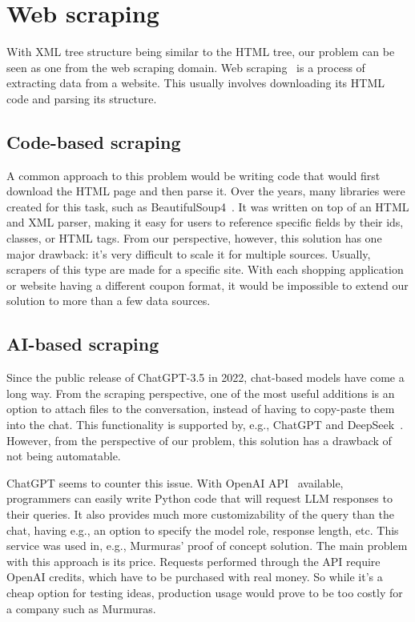 \documentclass[licencjacka,en]{pracamgr}
\begin{document}
\section{Web scraping}
With XML tree structure being similar to the HTML tree, our problem can be seen as one from the web scraping domain. Web scraping~\cite{WS} is a process of extracting data from a website. This usually involves downloading its HTML code and parsing its structure.

\subsection{Code-based scraping}
A common approach to this problem would be writing code that would first download the HTML page and then parse it. Over the years, many libraries were created for this task, such as BeautifulSoup4~\cite{zupa}. It was written on top of an HTML and XML parser, making it easy for users to reference specific fields by their ids, classes, or HTML tags. From our perspective, however, this solution has one major drawback: it's very difficult to scale it for multiple sources. Usually, scrapers of this type are made for a specific site. With each shopping application or website having a different coupon format, it would be impossible to extend our solution to more than a few data sources.

\subsection{AI-based scraping}
Since the public release of ChatGPT-3.5 in 2022, chat-based models have come a long way. From the scraping perspective, one of the most useful additions is an option to attach files to the conversation, instead of having to copy-paste them into the chat. This functionality is supported by, e.g., ChatGPT and DeepSeek~\cite{DS}. However, from the perspective of our problem, this solution has a drawback of not being automatable.

ChatGPT seems to counter this issue. With OpenAI API~\cite{OAPI} available, programmers can easily write Python code that will request LLM responses to their queries. It also provides much more customizability of the query than the chat, having e.g., an option to specify the model role, response length, etc. This service was used in, e.g., Murmuras' proof of concept solution. The main problem with this approach is its price. Requests performed through the API require OpenAI credits, which have to be purchased with real money. So while it's a cheap option for testing ideas, production usage would prove to be too costly for a company such as Murmuras.
\end{document}
